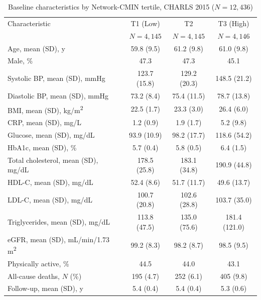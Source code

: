 \documentclass[11pt,a4paper]{article}
\begin{document}
\begin{table}[h]
\centering
\caption{Baseline characteristics by Network-CMIN tertile, CHARLS 2015 ($N = 12{,}436$)}
\label{tab:table1}
\begin{tabular}{lccc}
\toprule
Characteristic & T1 (Low) & T2 & T3 (High) \\
& $N = 4{,}145$ & $N = 4{,}145$ & $N = 4{,}146$ \\
\midrule
Age, mean (SD), y & 59.8 (9.5) & 61.2 (9.8) & 61.0 (9.8) \\
Male, \% & 47.3 & 47.3 & 45.1 \\
Systolic BP, mean (SD), mmHg & 123.7 (15.8) & 129.2 (20.3) & 148.5 (21.2) \\
Diastolic BP, mean (SD), mmHg & 73.2 (8.4) & 75.4 (11.5) & 78.7 (13.8) \\
BMI, mean (SD), kg/m\textsuperscript{2} & 22.5 (1.7) & 23.3 (3.0) & 26.4 (6.0) \\
CRP, mean (SD), mg/L & 1.2 (0.9) & 1.9 (1.7) & 5.2 (9.8) \\
Glucose, mean (SD), mg/dL & 93.9 (10.9) & 98.2 (17.7) & 118.6 (54.2) \\
HbA1c, mean (SD), \% & 5.7 (0.4) & 5.8 (0.5) & 6.4 (1.5) \\
Total cholesterol, mean (SD), mg/dL & 178.5 (25.8) & 183.1 (34.8) & 190.9 (44.8) \\
HDL-C, mean (SD), mg/dL & 52.4 (8.6) & 51.7 (11.7) & 49.6 (13.7) \\
LDL-C, mean (SD), mg/dL & 100.7 (20.8) & 102.6 (28.8) & 103.7 (35.0) \\
Triglycerides, mean (SD), mg/dL & 113.8 (47.5) & 135.0 (75.6) & 181.4 (121.0) \\
eGFR, mean (SD), mL/min/1.73 m\textsuperscript{2} & 99.2 (8.3) & 98.2 (8.7) & 98.5 (9.5) \\
Physically active, \% & 44.5 & 44.0 & 43.1 \\
All-cause deaths, $N$ (\%) & 195 (4.7) & 252 (6.1) & 405 (9.8) \\
Follow-up, mean (SD), y & 5.4 (0.4) & 5.4 (0.4) & 5.3 (0.6) \\
\bottomrule
\end{tabular}
\end{table}
\end{document}
